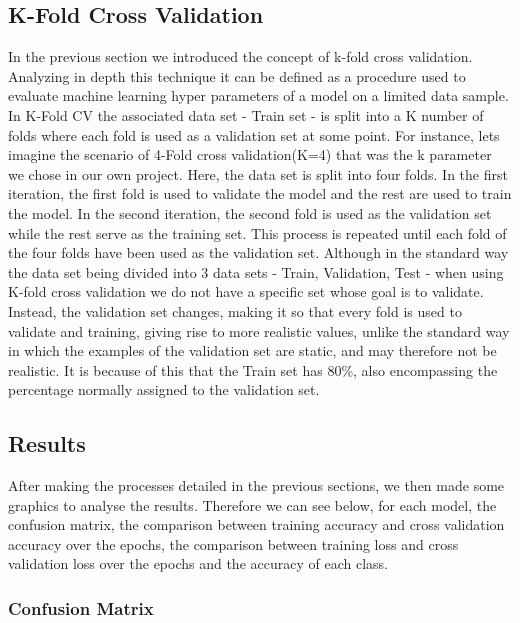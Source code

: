 \documentclass[conference]{IEEEtran}
\begin{document}
\subsection{K-Fold Cross Validation \cite{A} \cite{E}}
In the previous section we introduced the concept of k-fold cross validation. Analyzing in depth this technique it can be defined as a procedure used to evaluate machine learning hyper parameters of a model on a limited data sample. In K-Fold CV the associated data set - Train set - is split into a K number of folds where each fold is used as a validation set at some point. For instance, lets imagine the scenario of 4-Fold cross validation(K=4) that was the k parameter we chose in our own project. Here, the data set is split into four folds. In the first iteration, the first fold is used to validate the model and the rest are used to train the model. In the second iteration, the second fold is used as the validation set while the rest serve as the training set. This process is repeated until each fold of the four folds have been used as the validation set. Although in the standard way the data set being divided into 3 data sets - Train, Validation, Test - when using K-fold cross validation we do not have a specific set whose goal is to validate. Instead, the validation set changes, making it so that every fold is used to validate and training, giving rise to more realistic values, unlike the standard way in which the examples of the validation set are static, and may therefore not be realistic. It is because of this that the Train set has 80\%, also encompassing the percentage normally assigned to the validation set.

\subsection{Results}
After making the processes detailed in the previous sections, we then made some graphics to analyse the results. Therefore we can see below, for each model, the confusion matrix, the comparison between training accuracy and cross validation accuracy over the epochs, the comparison between training loss and cross validation loss over the epochs and the accuracy of each class.

\subsubsection{Confusion Matrix}
\end{document}

